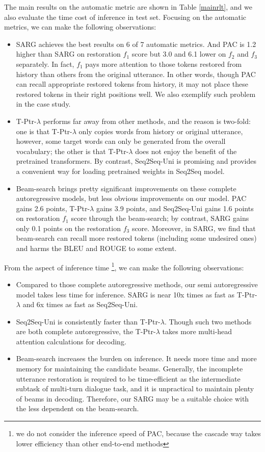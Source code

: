 The main results on the automatic metric are shown in Table \ref{mainrlt}, and we also evaluate the time cost of inference in test set. Focusing on the automatic metrics, we can make the following observations:
\begin{itemize}
	\item SARG achieves the best results on 6 of 7 automatic metrics. And PAC is 1.2 higher than SARG on restoration $f_1$ score but 3.0 and 6.1 lower on $f_2$ and $f_3$ separately. In fact, $f_1$ pays more attention to those tokens restored from history than others from the original utterance. In other words, though PAC can recall appropriate restored tokens from history, it may not place these restored tokens in their right positions well. We also exemplify such problem in the case study.


	\item T-Ptr-$\lambda$ performs far away from other methods, and the reason is two-fold: one is that T-Ptr-$\lambda$ only copies words from history or original utterance, however, some target words can only be generated from the overall vocabulary; the other is that T-Ptr-$\lambda$ does not enjoy the benefit of the pretrained transformers. By contrast,  Seq2Seq-Uni is promising and provides a convenient way for loading pretrained weights in Seq2Seq model.
	
	\item Beam-search brings pretty significant improvements on these complete autoregressive models, but less obvious improvements on our model. PAC gains 2.6 points, T-Ptr-$\lambda$ gains 3.9 points, and Seq2Seq-Uni gains 1.6 points on restoration $f_1$ score through the beam-search; by contrast, SARG gains only 0.1 points on the restoration $f_3$ score. Moreover, in SARG, we find that beam-search can recall more restored tokens (including some undesired ones) and harms the BLEU and ROUGE to some extent.
\end{itemize} 

From the aspect of inference time \footnote{we do not consider the inference speed of PAC, because the cascade way takes lower efficiency than other end-to-end methods}, we can make the following observations:
\begin{itemize}
	\item Compared to those complete autoregressive methods, our semi autoregressive model takes less time for inference. SARG is near 10x times as fast as T-Ptr-$\lambda$ and 6x times as fast as Seq2Seq-Uni.
	\item Seq2Seq-Uni is consistently faster than T-Ptr-$\lambda$. Though such two methods are both complete autoregressive, the T-Ptr-$\lambda$ takes more multi-head attention calculations for decoding.
	\item Beam-search increases the burden on inference. It needs more time and more memory for maintaining the candidate beams. Generally, the incomplete utterance restoration is required to be time-efficient as the intermediate subtask of multi-turn dialogue task, and it is unpractical to maintain plenty of beams in decoding. Therefore, our SARG may be a suitable choice with the less dependent on the beam-search.
\end{itemize}

